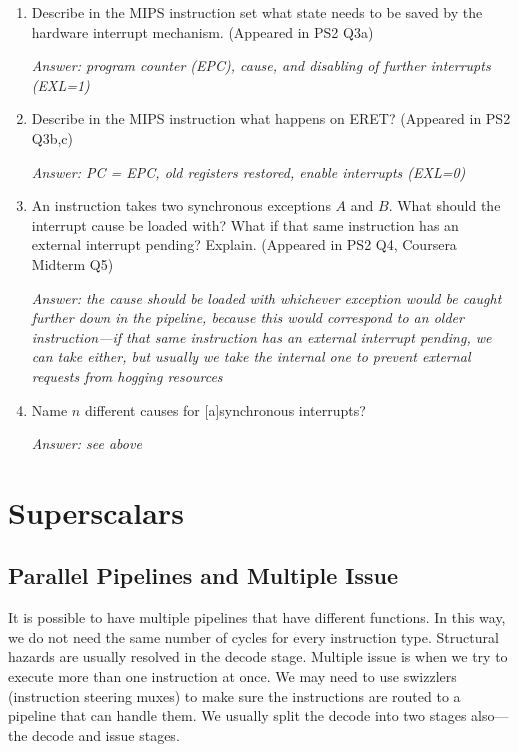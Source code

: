 \documentclass{article}
\begin{document}
\begin{enumerate}
\item Describe in the MIPS instruction set what state needs to be saved by the hardware interrupt mechanism. (Appeared in PS2 Q3a)

\textit{Answer: program counter (EPC), cause, and disabling of further interrupts (EXL=1)}

\item Describe in the MIPS instruction what happens on ERET? (Appeared in PS2 Q3b,c)

\textit{Answer: PC = EPC, old registers restored, enable interrupts (EXL=0)}

\item An instruction takes two synchronous exceptions $A$ and $B$.  What should the interrupt cause be loaded with?  What if that same instruction has an external interrupt pending? Explain. (Appeared in PS2 Q4, Coursera Midterm Q5)

\textit{Answer: the cause should be loaded with whichever exception would be caught further down in the pipeline, because this would correspond to an older instruction---if that same instruction has an external interrupt pending, we can take either, but usually we take the internal one to prevent external requests from hogging resources}

\item Name $n$ different causes for [a]synchronous interrupts?

\textit{Answer: see above}
\end{enumerate}

\section{Superscalars}

\subsection{Parallel Pipelines and Multiple Issue}
It is possible to have multiple pipelines that have different functions. In this way, we do not need the same number of cycles for every instruction type. Structural hazards are usually resolved in the decode stage. Multiple issue is when we try to execute more than one instruction at once. We may need to use swizzlers (instruction steering muxes) to make sure the instructions are routed to a pipeline that can handle them. We usually split the decode into two stages also---the decode and issue stages.
\end{document}
